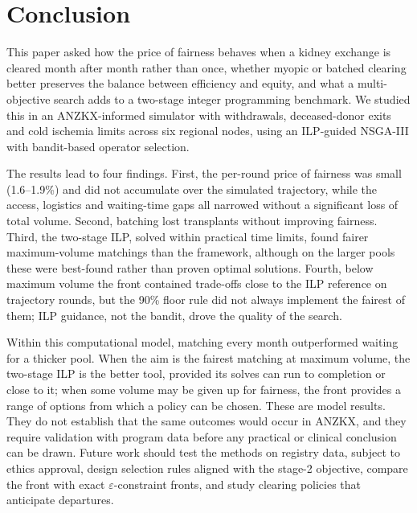 \documentclass[journal]{IEEEtran}
\begin{document}
\section{Conclusion}
\label{sec:conclusion}
This paper asked how the price of fairness behaves when a kidney
exchange is cleared month after month rather than once, whether
myopic or batched clearing better preserves the balance between
efficiency and equity, and what a multi-objective search adds to a
two-stage integer programming benchmark. We studied this in an
ANZKX-informed simulator with withdrawals, deceased-donor exits and cold
ischemia limits across six regional nodes, using an ILP-guided NSGA-III
with bandit-based operator selection.

The results lead to four findings. First, the per-round price of
fairness was small (1.6--1.9\%) and did not accumulate over the
simulated trajectory, while the access, logistics and waiting-time gaps
all narrowed without a significant loss of total volume. Second, batching lost
transplants without improving fairness. Third, the two-stage ILP, solved
within practical time limits, found fairer maximum-volume matchings than
the framework, although on the larger pools these were best-found rather
than proven optimal solutions. Fourth, below maximum volume the front contained trade-offs close to the ILP reference on trajectory rounds, but the 90\% floor rule did not always implement the fairest of them; ILP guidance, not the bandit, drove the quality of the search.

Within this computational model, matching every month outperformed
waiting for a thicker pool. When the aim is the fairest matching at maximum
volume, the two-stage ILP is the better tool, provided its solves can run
to completion or close to it; when some volume may be given up for
fairness, the front provides a range of options from which a policy can
be chosen. These are model results. They do not establish that the same
outcomes would occur in ANZKX, and they require validation with program
data before any practical or clinical conclusion can be drawn. Future
work should test the methods on registry data, subject to ethics
approval, design selection rules aligned with the stage-2 objective,
compare the front with exact $\varepsilon$-constraint fronts, and study
clearing policies that anticipate departures.

\REFERENCES
\end{document}
